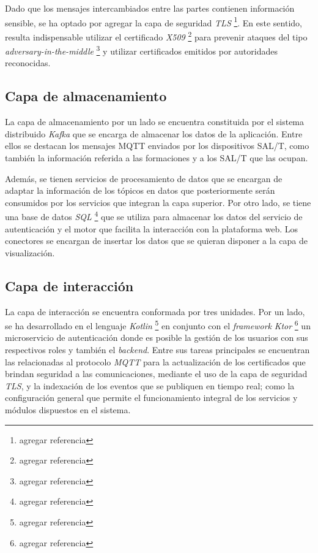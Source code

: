\documentclass[a4paper]{IEEEtran}
\begin{document}
Dado que los mensajes intercambiados entre las partes contienen información sensible, se ha optado por agregar la capa de seguridad \textit{TLS} \cite{b5} \footnote{agregar referencia}. En este sentido, resulta indispensable utilizar el certificado \textit{X509} \cite{b6} \footnote{agregar referencia} para prevenir ataques del tipo \textit{adversary-in-the-middle} \cite{b7} \footnote{agregar referencia} y utilizar certificados emitidos por autoridades reconocidas.


\subsection{Capa de almacenamiento}

La capa de almacenamiento por un lado se encuentra constituida por el sistema distribuido \textit{Kafka} que se encarga de almacenar los datos de la aplicación. Entre ellos se destacan los mensajes MQTT enviados por los dispositivos SAL/T, como también la información referida a las formaciones y a los SAL/T que las ocupan. 

Además, se tienen servicios de procesamiento de datos que se encargan de adaptar la información de los tópicos en datos que posteriormente serán consumidos por los servicios que integran la capa superior. Por otro lado, se tiene una base de datos \textit{SQL} \cite{b8} \footnote{agregar referencia} que se utiliza para almacenar los datos del servicio de autenticación y el motor que facilita la interacción con la plataforma web. Los conectores se encargan de insertar los datos que se quieran disponer a la capa de visualización.


\subsection{Capa de interacción}

La capa de interacción se encuentra conformada por tres unidades. Por un lado, se ha desarrollado en el lenguaje \textit{Kotlin} \cite{b9} \footnote{agregar referencia} en conjunto con el \textit{framework} \textit{Ktor} \cite{b10} \footnote{agregar referencia} un microservicio de autenticación donde es posible la gestión de los usuarios con sus respectivos roles y también el \textit{backend}. Entre sus tareas principales se encuentran las relacionadas al protocolo \textit{MQTT} para la actualización de los certificados que brindan seguridad a las comunicaciones, mediante el uso de la capa de seguridad \textit{TLS}, y la indexación de los eventos que se publiquen en tiempo real; como la configuración general que permite el funcionamiento integral de los servicios y módulos dispuestos en el sistema.
\end{document}
